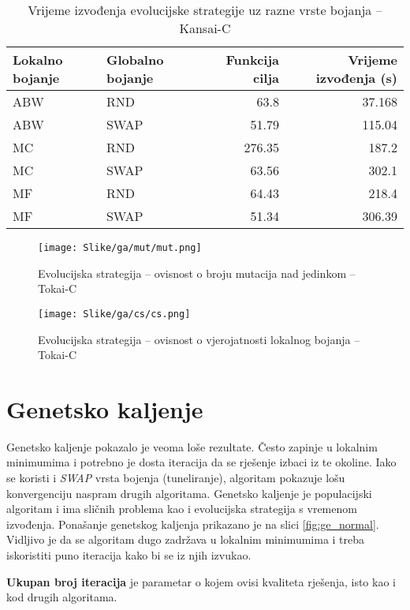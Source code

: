 \documentclass[times, utf8, diplomski, numeric]{fer}
\begin{document}
\begin{table}[htb]
	\caption{Vrijeme izvođenja evolucijske strategije uz razne vrste bojanja -- Kansai-C}
	\label{tbl:es-cs1}
	\centering
	\begin{tabular}{|l||l|r|r|} \hline
	Lokalno bojanje & Globalno bojanje & Funkcija cilja & Vrijeme izvođenja (s)\\ \hline \hline
	ABW & RND & 63.8 & 37.168 \\ \hline 
	ABW & SWAP & 51.79 & 115.04 \\  \hline
	MC & RND & 276.35 & 187.2 \\ \hline
	MC & SWAP & 63.56 &  302.1 \\  \hline 
	MF & RND & 64.43 & 218.4 \\ \hline
	MF & SWAP & 51.34 & 306.39 \\ \hline
	\end{tabular}
\end{table}


\begin{figure}[htb]
	\texttt{[image: Slike/ga/mut/mut.png]}
	\caption{Evolucijska strategija -- ovisnost o broju mutacija nad jedinkom -- Tokai-C}
	\label{fig:gen_mut}
\end{figure}

\begin{figure}[htb]
	\texttt{[image: Slike/ga/cs/cs.png]}
	\caption{Evolucijska strategija -- ovisnost o vjerojatnosti lokalnog bojanja -- Tokai-C}
	\label{fig:gen_cs}
\end{figure}


\clearpage


\section{Genetsko kaljenje}

Genetsko kaljenje pokazalo je veoma loše rezultate. Često zapinje u lokalnim minimumima i potrebno je dosta iteracija da se rješenje izbaci iz te okoline. Iako se koristi i \emph{SWAP} vrsta bojenja (tuneliranje), algoritam pokazuje lošu konvergenciju naspram drugih algoritama. Genetsko kaljenje je populacijski algoritam i ima sličnih problema kao i evolucijska strategija s vremenom izvođenja. Ponašanje genetskog kaljenja prikazano je na slici \ref{fig:ge_normal}. Vidljivo je da se algoritam dugo zadržava u lokalnim minimumima i treba iskoristiti puno iteracija kako bi se iz njih izvukao.

\textbf{Ukupan broj iteracija} je parametar o kojem ovisi kvaliteta rješenja, isto kao i kod drugih algoritama.
\end{document}
